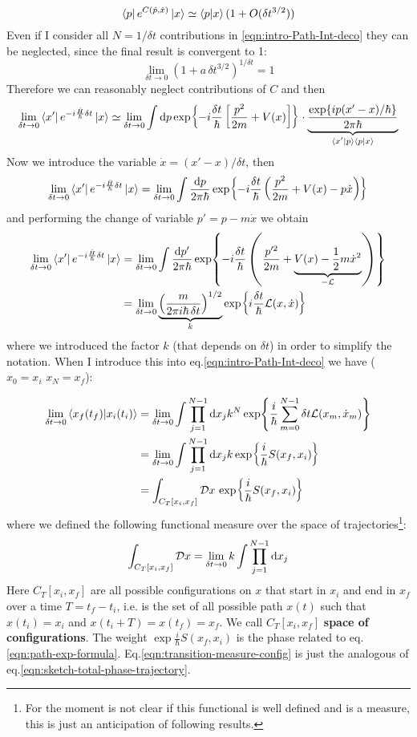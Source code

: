 \documentclass[../main/main.tex]{subfiles}
\begin{document}
\[\bra{p}e^{C(\hat p,\hat x)}\ket{x}\simeq\braket{p}{x}(1+O(\delta t^{3/2}))\]
Even if I consider all $N=1/\delta t$ contributions in \eqref{eqn:intro-Path-Int-deco} they can be neglected, since the final result is convergent to 1: 
\[\lim_{\delta t\to0}(1+a\,\delta t^{3/2})^{1/\delta t}=1\]
Therefore we can reasonably neglect contributions of $C$ and then
\[\lim_{\delta t\to0}\bra{x'}e^{-i\frac{\hat H}{\hbar}\delta t}\ket{x}
\simeq\lim_{\delta t\to0}\int\textup{d} p\exp{-i\frac{\delta t}{\hbar}\left[\frac{p^2}{2m}+V(x)\right]}\cdot\underbrace{\frac{\exp{i p(x'-x)/\hbar}}{2\pi\hbar}}_{\braket*{x'}{p}\braket{p}{x}}\]
Now we introduce the variable $\dot x=(x'-x)/\delta t$, then 
\[\lim_{\delta t\to0}\bra{x'}e^{-i\frac{\hat H}{\hbar}\delta t}\ket{x}
=\lim_{\delta t\to0}\int\frac{\textup{d} p}{2\pi\hbar}\exp{-i\frac{\delta t}{\hbar}\left(\frac{p^2}{2m}+V(x)-p\dot x\right)}\]
and performing the change of variable $p'=p-m\dot x$ we obtain
\begin{align*}
\lim_{\delta t\to0}\bra{x'}e^{-i\frac{\hat H}{\hbar}\delta t}\ket{x}
&=\lim_{\delta t\to0}\int\frac{\textup{d} p'}{2\pi\hbar}\exp{-i\frac{\delta t}{\hbar}\left(\frac{p'^2}{2m}+\underbrace{V(x)-\frac12m\dot x^2}_{-\mathcal L}\right)}\\
&=\lim_{\delta t\to0}\underbrace{\left(\frac{m}{2\pi i\hbar\,\delta t}\right)^{1/2}}_{k}\exp{i\frac{\delta t}{\hbar}\mathcal L(x,\dot x)}
\end{align*}
where we introduced the factor $k$ (that depends on $\delta t$) in order to simplify the notation. When I introduce this into eq.\eqref{eqn:intro-Path-Int-deco} we have ($x_0=x_i$ $x_N=x_f$):

\begin{align}
\lim_{\delta t\to0}\braket{x_f(t_f)}{x_i(t_i)}
&=\lim_{\delta t\to0}\int\prod_{j=1}^{N-1}\textup{d} x_j
k^N\exp{\frac{i}{\hbar}\sum_{m=0}^{N-1}\delta t\mathcal L(x_m,\dot x_m)}\notag\\
&=\lim_{\delta t\to0}\int\prod_{j=1}^{N-1}\textup{d} x_j
k\exp{\frac{i}{\hbar}S(x_f,x_i)}\notag\\
&=\int_{C_T[x_i,x_f]} \mathcal Dx\,\exp{\frac{i}{\hbar}S(x_f,x_i)}\label{eqn:transition-measure-config}
\end{align}
where we defined the following functional measure over the space of trajectories\footnote{For the moment is not  clear if this functional is well defined and is a measure, this is just an anticipation of following results.}:
\[\int_{C_T[x_i,x_f]} \mathcal Dx = \lim_{\delta t\to0} k \int\prod_{j=1}^{N-1}\textup{d} x_j\]
Here $C_T[x_i,x_f]$ are all possible configurations on $x$ that start in $x_i$ and end in $x_f$ over a time $T=t_f-t_i$, i.e. is the set of all possible path $x(t)$ such that $x(t_i)=x_i$ and $x(t_i+T)=x(t_f)=x_f$. We call ${C_T[x_i,x_f]}$ \textbf{space of configurations}. The weight $\exp{\frac{i}{\hbar}S(x_f,x_i)}$ is the phase related to eq.\eqref{eqn:path-exp-formula}. Eq.\eqref{eqn:transition-measure-config} is just the analogous of eq.\eqref{eqn:sketch-total-phase-trajectory}. 
\end{document}
